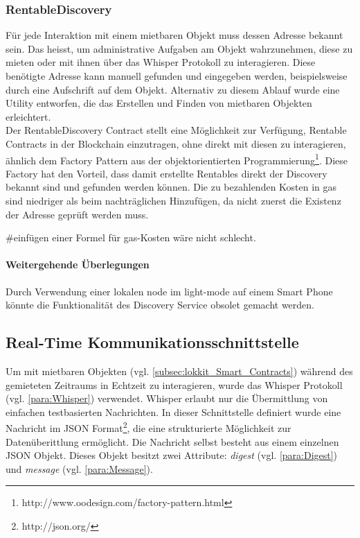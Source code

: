 \subsubsection{RentableDiscovery}
Für jede Interaktion mit einem mietbaren Objekt muss dessen Adresse bekannt sein. Das heisst, um administrative Aufgaben am Objekt wahrzunehmen, diese zu mieten oder mit ihnen über das Whisper Protokoll zu interagieren. Diese benötigte Adresse kann manuell gefunden und eingegeben werden, beispielsweise durch eine Aufschrift auf dem Objekt. Alternativ zu diesem Ablauf wurde eine Utility entworfen, die das Erstellen und Finden von mietbaren Objekten erleichtert.
\\Der RentableDiscovery Contract stellt eine Möglichkeit zur Verfügung, Rentable Contracts in der Blockchain einzutragen, ohne direkt mit diesen zu interagieren, ähnlich dem Factory Pattern aus der objektorientierten Programmierung\footnote{http://www.oodesign.com/factory-pattern.html}. Diese Factory hat den Vorteil, dass damit erstellte Rentables direkt der Discovery bekannt sind und gefunden werden können. Die zu bezahlenden Kosten in gas sind niedriger als beim nachträglichen Hinzufügen, da nicht zuerst die Existenz der Adresse geprüft werden muss.

\#einfügen einer Formel für gas-Kosten wäre nicht schlecht.

\paragraph{Weitergehende Überlegungen}
Durch Verwendung einer lokalen node im light-mode auf einem Smart Phone könnte die Funktionalität des Discovery Service obsolet gemacht werden.

\subsection{Real-Time Kommunikationsschnittstelle}
Um mit mietbaren Objekten (vgl. \ref{subsec:lokkit_Smart_Contracts}) während des gemieteten Zeitraums in Echtzeit zu interagieren, wurde das Whisper Protokoll (vgl. \ref{para:Whisper}) verwendet. Whisper erlaubt nur die Übermittlung von einfachen testbasierten Nachrichten. In dieser Schnittstelle definiert wurde eine Nachricht im JSON Format\footnote{http://json.org/}, die eine strukturierte Möglichkeit zur Datenüberittlung ermöglicht.
Die Nachricht selbst besteht aus einem einzelnen JSON Objekt. Dieses Objekt besitzt zwei Attribute: \emph{digest} (vgl. \ref{para:Digest}) und \emph{message} (vgl. \ref{para:Message}).

